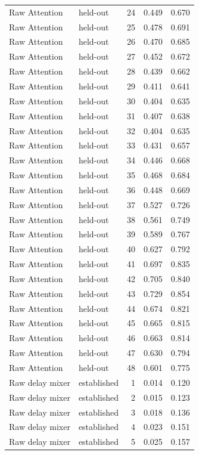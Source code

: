 \begin{tabular}{llrrr}
Raw Attention & held-out & 24 & 0.449 & 0.670 \\
Raw Attention & held-out & 25 & 0.478 & 0.691 \\
Raw Attention & held-out & 26 & 0.470 & 0.685 \\
Raw Attention & held-out & 27 & 0.452 & 0.672 \\
Raw Attention & held-out & 28 & 0.439 & 0.662 \\
Raw Attention & held-out & 29 & 0.411 & 0.641 \\
Raw Attention & held-out & 30 & 0.404 & 0.635 \\
Raw Attention & held-out & 31 & 0.407 & 0.638 \\
Raw Attention & held-out & 32 & 0.404 & 0.635 \\
Raw Attention & held-out & 33 & 0.431 & 0.657 \\
Raw Attention & held-out & 34 & 0.446 & 0.668 \\
Raw Attention & held-out & 35 & 0.468 & 0.684 \\
Raw Attention & held-out & 36 & 0.448 & 0.669 \\
Raw Attention & held-out & 37 & 0.527 & 0.726 \\
Raw Attention & held-out & 38 & 0.561 & 0.749 \\
Raw Attention & held-out & 39 & 0.589 & 0.767 \\
Raw Attention & held-out & 40 & 0.627 & 0.792 \\
Raw Attention & held-out & 41 & 0.697 & 0.835 \\
Raw Attention & held-out & 42 & 0.705 & 0.840 \\
Raw Attention & held-out & 43 & 0.729 & 0.854 \\
Raw Attention & held-out & 44 & 0.674 & 0.821 \\
Raw Attention & held-out & 45 & 0.665 & 0.815 \\
Raw Attention & held-out & 46 & 0.663 & 0.814 \\
Raw Attention & held-out & 47 & 0.630 & 0.794 \\
Raw Attention & held-out & 48 & 0.601 & 0.775 \\
Raw delay mixer & established & 1 & 0.014 & 0.120 \\
Raw delay mixer & established & 2 & 0.015 & 0.123 \\
Raw delay mixer & established & 3 & 0.018 & 0.136 \\
Raw delay mixer & established & 4 & 0.023 & 0.151 \\
Raw delay mixer & established & 5 & 0.025 & 0.157 \\

\end{tabular}
